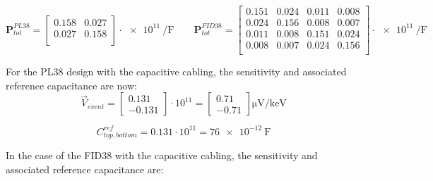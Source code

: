\begin{equation}
\bm{P}_{tot}^{PL38}
=
\begin{bmatrix}
  0.158 & 0.027 \\
  0.027 & 0.158 \\
\end{bmatrix}
\cdot
\SI{e11}{\per\farad}
\quad \quad
\bm{P}_{tot}^{FID38} = 
\begin{bmatrix}
  0.151 & 0.024 & 0.011 & 0.008\\
  0.024 & 0.156 & 0.008 & 0.007\\
  0.011 & 0.008 & 0.151 & 0.024\\
  0.008 & 0.007 & 0.024 & 0.156\\
\end{bmatrix}
\cdot \SI{e11}{\per\farad}
\end{equation}

For the PL38 design with the capacitive cabling, the sensitivity and associated reference capacitance are now:
\begin{equation}
\vec{V}_{event}
=
\begin{bmatrix}
0.131 \\
-0.131
\end{bmatrix}
\cdot 10^{11}
=
\begin{bmatrix}
0.71 \\
-0.71
\end{bmatrix}
\si{\micro\volt\per\kilo\eV}
\end{equation}

\begin{equation}
C_{top, bottom}^{ref}
= 0.131 \cdot 10^{11}
= \SI{76e-12}{\farad}
\end{equation}

In the case of the FID38 with the capacitive cabling, the sensitivity and associated reference capacitance are:

